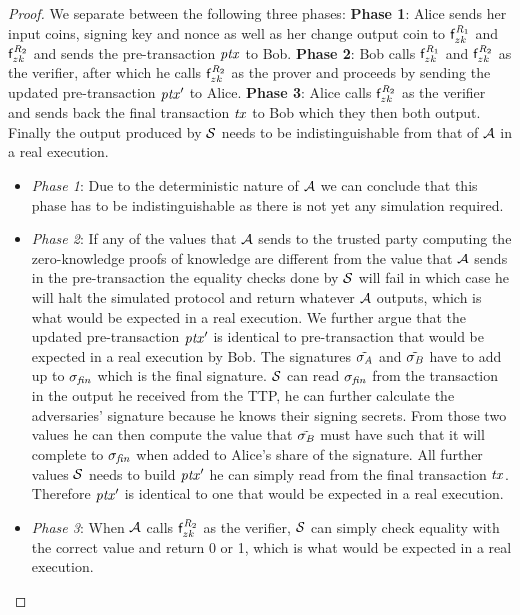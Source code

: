 \begin{proof}
    We separate between the following three phases:
    \textbf{Phase 1}: Alice sends her input coins, signing key and nonce as well as her change output coin to $\mathsf{f}^{\mathit{R}_1}_{zk}$ and $\mathsf{f}^{\mathit{R}_2}_{zk}$ and sends the pre-transaction $\mathit{ptx}$ to Bob.
    \textbf{Phase 2}: Bob calls $\mathsf{f}^{\mathit{R}_1}_{zk}$ and $\mathsf{f}^{\mathit{R}_2}_{zk}$ as the verifier, after which he calls $\mathsf{f}^{\mathit{R}_2}_{zk}$ as the prover and proceeds by sending the updated pre-transaction ${\mathit{ptx}}'$ to Alice.
    \textbf{Phase 3}: Alice calls $\mathsf{f}^{\mathit{R}_2}_{zk}$ as the verifier and sends back the final transaction $\mathit{tx}$ to Bob which they then both output.
    Finally the output produced by $\mathcal{S}$ needs to be indistinguishable from that of $\mathcal{A}$ in a real execution.
    \begin{itemize}
        \item \textit{Phase 1}: Due to the deterministic nature of $\mathcal{A}$ we can conclude that this phase has to be indistinguishable as there is not yet any simulation required.
        \item \textit{Phase 2}: If any of the values that $\mathcal{A}$ sends to the trusted party computing the zero-knowledge proofs of knowledge are different from the value that $\mathcal{A}$ sends in the pre-transaction the equality checks done by $\mathcal{S}$ will fail in which case he will halt the simulated protocol and return whatever $\mathcal{A}$ outputs, which is what would be expected in a real execution.
        We further argue that the updated pre-transaction ${\mathit{ptx}}'$ is identical to pre-transaction that would be expected in a real execution by Bob.
        The signatures $\tilde{\sigma_{\mathit{A}}}$ and $\tilde{\sigma_{\mathit{B}}}$ have to add up to $\sigma_{\mathit{fin}}$ which is the final signature.
        $\mathcal{S}$ can read $\sigma_{\mathit{fin}}$ from the transaction in the output he received from the TTP, he can further calculate the adversaries' signature because he knows their signing secrets.
        From those two values he can then compute the value that $\tilde{\sigma_{\mathit{B}}}$ must have such that it will complete to $\sigma_{\mathit{fin}}$ when added to Alice's share of the signature.
        All further values $\mathcal{S}$ needs to build ${\mathit{ptx}}'$ he can simply read from the final transaction $\mathit{tx}$.
        Therefore ${\mathit{ptx}}'$ is identical to one that would be expected in a real execution.
        \item \textit{Phase 3}: When $\mathcal{A}$ calls $\mathsf{f}^{\mathit{R}_2}_{zk}$ as the verifier, $\mathcal{S}$ can simply check equality with the correct value and return 0 or 1, which is what would be expected in a real execution.
    \end{itemize}
    


\end{proof}

